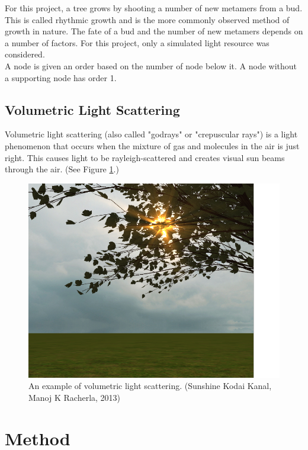 \documentclass{article}
\begin{document}
  			For this project, a tree grows by shooting a number of new metamers from a bud. This is called rhythmic growth and is the more commonly observed method of growth in nature. \citep{barthelemy2007plant} The fate of a bud and the number of new metamers depends on a number of factors. For this project, only a simulated light resource was considered.\\
  			
  			A node is given an order based on the number of node below it. A node without a supporting node has order 1.
  		\subsection{Volumetric Light Scattering}
  			Volumetric light scattering (also called "godrays" or "crepuscular rays") is a light phenomenon that occurs when the mixture of gas and molecules in the air is just right. This causes light to be rayleigh-scattered and creates visual sun beams through the air. (See Figure \ref{fig:godrayexample}.)
  			
  			\begin{figure}[h!]
  				\includegraphics[scale=0.7]{godrays}
  				\caption{An example of volumetric light scattering. (Sunshine Kodai Kanal, Manoj K Racherla, 2013)}
  				\label{fig:godrayexample}
  			\end{figure}
  			
  		
  			
  	\section{Method}
\end{document}
